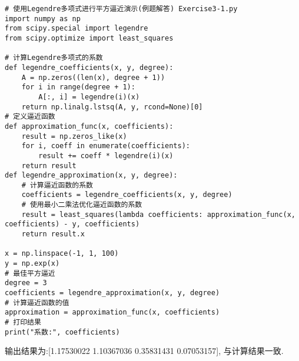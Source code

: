 \begin{lstlisting}
# 使用Legendre多项式进行平方逼近演示(例题解答) Exercise3-1.py
import numpy as np
from scipy.special import legendre
from scipy.optimize import least_squares

# 计算Legendre多项式的系数
def legendre_coefficients(x, y, degree):
    A = np.zeros((len(x), degree + 1))
    for i in range(degree + 1):
        A[:, i] = legendre(i)(x)
    return np.linalg.lstsq(A, y, rcond=None)[0]
# 定义逼近函数
def approximation_func(x, coefficients):
    result = np.zeros_like(x)
    for i, coeff in enumerate(coefficients):
        result += coeff * legendre(i)(x)
    return result
def legendre_approximation(x, y, degree):
    # 计算逼近函数的系数
    coefficients = legendre_coefficients(x, y, degree)
    # 使用最小二乘法优化逼近函数的系数
    result = least_squares(lambda coefficients: approximation_func(x, coefficients) - y, coefficients)
    return result.x

x = np.linspace(-1, 1, 100)
y = np.exp(x)
# 最佳平方逼近
degree = 3
coefficients = legendre_approximation(x, y, degree)
# 计算逼近函数的值
approximation = approximation_func(x, coefficients)
# 打印结果
print("系数:", coefficients)
\end{lstlisting}

输出结果为:[1.17530022 1.10367036 0.35831431 0.07053157], 与计算结果一致.